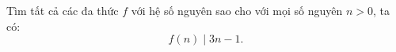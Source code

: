 \ifshowproblem
\begin{problem}\label{example:FRA-2015-TST4-P1}
    Tìm tất cả các đa thức \( f \) với hệ số nguyên sao cho với mọi số nguyên \( n > 0 \), ta có:
    \[
        f(n) \mid 3n - 1.
    \]
\end{problem}
\fi

\fi